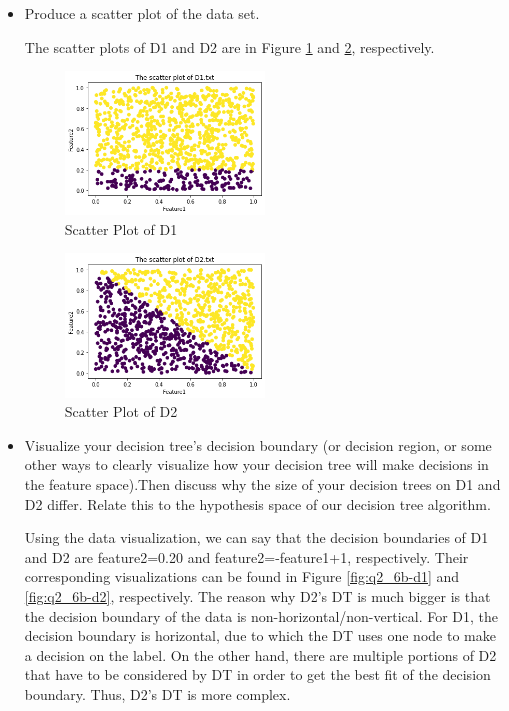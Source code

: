 \documentclass[a4paper]{article}
\theoremstyle{definition}
\newenvironment{soln}{
    \leavevmode\color{blue}\ignorespaces
}{}
\begin{document}
\begin{enumerate}
\begin{itemize}
  \item Produce a scatter plot of the data set.\\
  \begin{soln}
  The scatter plots of D1 and D2 are in Figure \ref{fig:q2_6a-d1} and \ref{fig:q2_6a-d2}, respectively.
      \begin{figure}[h!]
        \centering
        \includegraphics[width=0.5\textwidth]{images/q2_6a_D1.png}
        \caption{Scatter Plot of D1}
        \label{fig:q2_6a-d1}
    \end{figure}

      \begin{figure}[h!]
        \centering
        \includegraphics[width=0.5\textwidth]{images/q2_6a_D2.png}
        \caption{Scatter Plot of D2}
        \label{fig:q2_6a-d2}
    \end{figure}
  \end{soln}


    


  \item Visualize your decision tree's decision boundary (or decision region, or some other ways to clearly visualize how your decision tree will make decisions in the feature space).Then discuss why the size of your decision trees on D1 and D2 differ.  Relate this to the hypothesis space of our decision tree algorithm. \\
  \begin{soln}
      Using the data visualization, we can say that the decision boundaries of D1 and D2 are feature2=0.20 and feature2=-feature1+1, respectively. Their corresponding visualizations can be found in Figure \ref{fig:q2_6b-d1} and \ref{fig:q2_6b-d2}, respectively. The reason why D2's DT is much bigger is that the decision boundary of the data is non-horizontal/non-vertical. For D1, the decision boundary is horizontal, due to which the DT uses one node to make a decision on the label. On the other hand, there are multiple portions of D2 that have to be considered by DT in order to get the best fit of the decision boundary. Thus, D2's DT is more complex.


\end{soln}
\end{itemize}
\end{enumerate}
\end{document}

